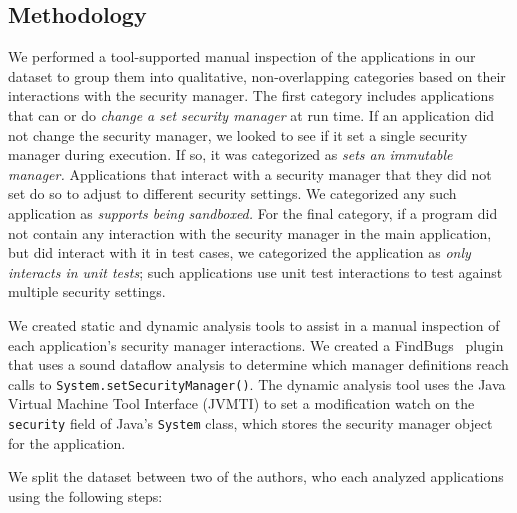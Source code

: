 \documentclass{sig-alternate-05-2015}
\begin{document}
\subsection{Methodology}
\label{sec:methodology}

We performed a tool-supported manual inspection of the applications in our
dataset to group them
into qualitative, non-overlapping categories based on their interactions with the security 
manager. The first category includes applications that can or do
\emph{change a set security manager} at run time.
If an application did not change the security manager, 
we looked to see if it set a single security manager 
during execution.  If so, it
was categorized as \emph{sets an immutable manager.} Applications that 
interact with a security manager that they did not set do so 
to adjust to different security settings.
We categorized any such application
as \emph{supports being sandboxed.} %
For the final category, if a
program did not contain any interaction with the security manager in 
the main application, but did interact with it
in test cases, we categorized the
application as \emph{only interacts in unit tests}; such applications use unit
test interactions to test against multiple security settings.

We created static and dynamic analysis tools
to assist in a manual inspection of each application's security manager
interactions. We created a 
FindBugs~\cite{hovemeyer_finding_2004} plugin that uses a sound dataflow analysis to determine which manager definitions reach calls to \texttt{System.setSecurityManager()}.
The dynamic analysis tool uses the Java Virtual Machine
Tool Interface (JVMTI) \cite{_jvmti} to set a modification watch
on the \texttt{security} field of Java's \texttt{System} class, which
stores the security manager object for the application.

We split the dataset between two of the authors, who each analyzed
applications using the following steps:
\end{document}
